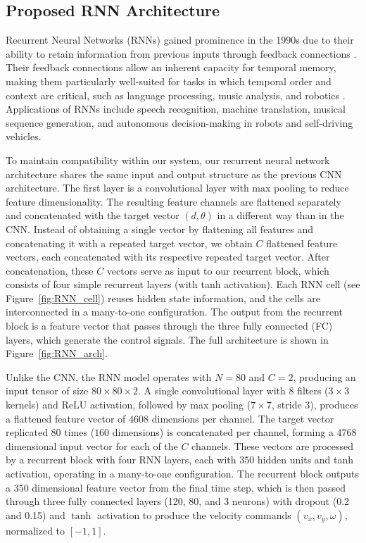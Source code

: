 \documentclass[robotics,article,submit,pdftex,moreauthors]{Definitions/mdpi}
\begin{document}
\subsection{Proposed RNN Architecture}\label{subsec:rnn_arq}

Recurrent Neural Networks (RNNs) gained prominence in the 1990s due to their ability to retain information from previous inputs through feedback connections \citep{elman1990finding}. Their feedback connections allow an inherent capacity for temporal memory, making them particularly well-suited for tasks in which temporal order and context are critical, such as language processing, music analysis, and robotics \citep{Danilorecurrent2001}. Applications of RNNs include speech recognition, machine translation, musical sequence generation, and autonomous decision-making in robots and self-driving vehicles.

To maintain compatibility within our system, our recurrent neural network architecture shares the same input and output structure as the previous CNN architecture. The first layer is a convolutional layer with max pooling to reduce feature dimensionality. The resulting feature channels are flattened separately and concatenated with the target vector $(d, \theta)$ in a different way than in the CNN. Instead of obtaining a single vector by flattening all features and concatenating it with a repeated target vector, we obtain $C$ flattened feature vectors, each concatenated with its respective repeated target vector. After concatenation, these $C$ vectors serve as input to our recurrent block, which consists of four simple recurrent layers (with tanh activation). Each RNN cell (see Figure~\ref{fig:RNN_cell}) reuses hidden state information, and the cells are interconnected in a many-to-one configuration. The output from the recurrent block is a feature vector that passes through the three fully connected (FC) layers, which generate the control signals. The full architecture is shown in Figure~\ref{fig:RNN_arch}.

Unlike the CNN, the RNN model operates with $N = 80$ and $C = 2$, producing an input tensor of size $80 \times 80 \times 2$. A single convolutional layer with 8 filters ($3 \times 3$ kernels) and ReLU activation, followed by max pooling ($7 \times 7$, stride 3), produces a flattened feature vector of $4608$ dimensions per channel. The target vector replicated $80$ times ($160$ dimensions) is concatenated per channel, forming a $4768$ dimensional input vector for each of the $C$ channels. These vectors are processed by a recurrent block with four RNN layers, each with $350$ hidden units and tanh activation, operating in a many-to-one configuration. The recurrent block outputs a $350$ dimensional feature vector from the final time step, which is then passed through three fully connected layers (120, 80, and 3 neurons) with dropout (0.2 and 0.15) and $\tanh$ activation to produce the velocity commands $(v_x, v_y, \omega)$, normalized to $[-1, 1]$.
\end{document}
